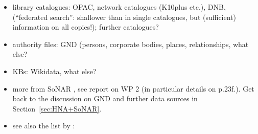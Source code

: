\begin{itemize}
  \item
    library catalogues: OPAC, network catalogues (K10plus etc.), DNB,
     (\enquote{federated search}: shallower than in single catalogues,
    but (sufficient) information on all copies!);
    further catalogues?
  \item
    authority files: \gls{GND} (persons, corporate bodies, places, relationships, what else?
  \item
    KBs: Wikidata, what else?
  \item
    more from \gls{SoNAR} , see report on WP 2 (in particular details on p.23f.).
    Get back to the discussion on \gls{GND} and further data sources in Section~\ref{sec:HNA+SoNAR}.
  \item
    see also the list by \autocite{Menzel2020}:


\end{itemize}
